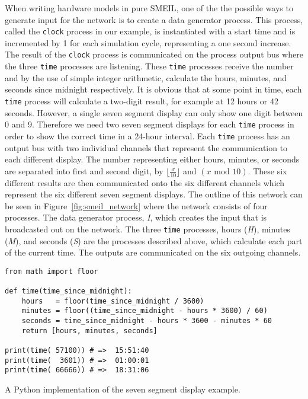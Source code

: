 When writing hardware models in pure SMEIL, one of the the possible ways to generate input for the network is to create a data generator process. This process, called the \texttt{clock} process in our example, is instantiated with a start time and is incremented by 1 for each simulation cycle, representing a one second increase. The result of the \texttt{clock} process is communicated on the process output bus where the three \texttt{time} processes are listening. These \texttt{time} processes receive the number and by the use of simple integer arithmetic, calculate the hours, minutes, and seconds since midnight respectively. It is obvious that at some point in time, each \texttt{time} process will calculate a two-digit result, for example at 12 hours or 42 seconds. However, a single seven segment display can only show one digit between 0 and 9. Therefore we need two seven segment displays for each \texttt{time} process in order to show the correct time in a 24-hour interval. Each \texttt{time} process has an output bus with two individual channels that represent the communication to each different display. The number representing either hours, minutes, or seconds are separated into first and second digit, by $\lfloor \frac{x}{10} \rfloor$ and $(x \text{ mod } 10)$. These six different results are then communicated onto the six different channels which represent the six different seven segment displays. The outline of this network can be seen in Figure~\ref{fig:smeil_network} where the network consists of four processes. The data generator process, \textit{I}, which creates the input that is broadcasted out on the network. The three \texttt{time} processes, hours (\textit{H}), minutes (\textit{M}), and seconds (\textit{S}) are the processes described above, which calculate each part of the current time. The outputs are communicated on the six outgoing channels.
\\
\begin{listing}
\begin{verbatim}
from math import floor

def time(time_since_midnight):
    hours   = floor(time_since_midnight / 3600)
    minutes = floor((time_since_midnight - hours * 3600) / 60)
    seconds = time_since_midnight - hours * 3600 - minutes * 60
    return [hours, minutes, seconds]

print(time( 57100)) # =>  15:51:40
print(time(  3601)) # =>  01:00:01
print(time( 66666)) # =>  18:31:06
\end{verbatim}
\caption{A Python implementation of the seven segment display example.}
\label{lst:python}
\end{listing}
